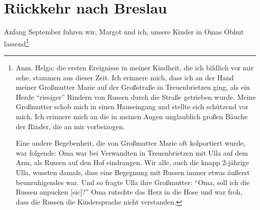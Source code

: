 \section{Rückkehr nach Breslau}

 Anfang September fuhren wir, Margot und ich, unsere Kinder in Omas Obhut lassend\footnote{
	Anm. Helga: die ersten Ereignisse in meiner Kindheit, die ich bildlich vor mir sehe, stammen aus dieser Zeit. Ich erinnere mich, dass ich an der Hand meiner Großmutter Marie auf der Großstraße in Treuenbrietzen ging, als ein Herde \enquote{riesiger} Rindern von Russen durch die Straße getrieben wurde. Meine Großmutter schob mich in einen Hauseingang und stellte sich schützend vor mich. Ich erinnere mich an die in meinen Augen unglaublich großen Bäuche der Rinder, die an mir vorbeizogen.
	
	Eine andere Begebenheit, die von Großmutter Marie oft kolportiert wurde, war folgende: Oma war bei Verwandten in Treuenbrietzen mit Ulla auf dem Arm, als Russen auf den Hof eindrangen. Wir alle, auch die knapp 2-jährige Ulla, wussten damals, dass eine Begegnung mit Russen immer etwas äußerst beunruhigendes war. Und so fragte Ulla ihre Großmutter: \enquote{Oma, soll ich die Russen anpucken [sic]?} Oma rutschte das Herz in die Hose und war froh, dass die Russen die Kindersprache nicht verstanden.
	
}
